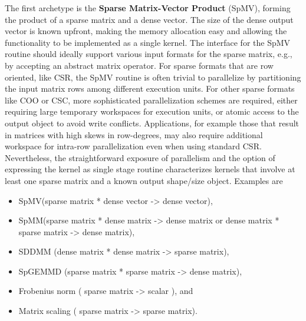 \documentclass[manuscript,review]{acmart}
\begin{document}
        
The first archetype is the \textbf{Sparse Matrix-Vector Product} (SpMV), forming the product of a sparse matrix and a dense vector. The size of the dense output vector is known upfront, making the memory allocation easy and allowing the functionality to be implemented as a single kernel. The interface for the SpMV routine should ideally support various input formats for the sparse matrix, e.g., by accepting an abstract matrix operator. 
For sparse formats that are row oriented, like CSR, the SpMV routine is often trivial to parallelize by partitioning the input matrix rows among different execution units.  For other sparse formats like COO or CSC, more sophisticated parallelization schemes are required, either requiring large temporary workspaces for execution units, or atomic access to the output object to avoid write conflicts. Applications, for example those that result in matrices with high skews in row-degrees, may also require additional workspace for intra-row parallelization even when using standard CSR. Nevertheless, the straightforward exposure of parallelism and the option of expressing the kernel as single stage routine characterizes kernels that involve at least one sparse matrix and a known output shape/size object. Examples are
\begin{itemize}
\item SpMV(sparse matrix  * dense vector -> dense vector), 
\item SpMM(sparse matrix * dense matrix -> dense matrix or   dense matrix * sparse matrix -> dense matrix), 
\item SDDMM (dense matrix * dense matrix -> sparse matrix), 
\item SpGEMMD (sparse matrix * sparse matrix  -> dense matrix), 
\item Frobenius norm ( sparse matrix -> scalar ), and
\item Matrix scaling ( sparse matrix -> sparse matrix).
\end{itemize}
\end{document}
